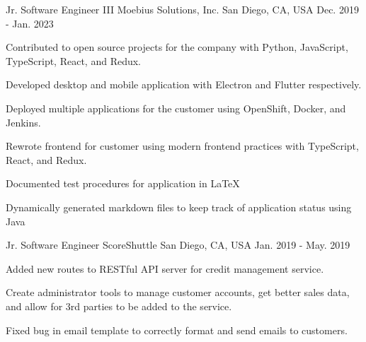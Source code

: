 

\begin{cventries}

	\cventry
	{Jr. Software Engineer III} %
	{Moebius Solutions, Inc.} %
	{San Diego, CA, USA} %
    {Dec. 2019 - Jan. 2023} %
	{
		\begin{cvitems} %
			\item {Contributed to open source projects for the company with Python, JavaScript, TypeScript, React, and Redux.}
			\item {Developed desktop and mobile application with Electron and Flutter respectively.}
			\item {Deployed multiple applications for the customer using OpenShift, Docker, and Jenkins.}
			\item {Rewrote frontend for customer using modern frontend practices with TypeScript, React, and Redux.}
			\item {Documented test procedures for application in LaTeX}
			\item {Dynamically generated markdown files to keep track of application status using Java}
		\end{cvitems}
	}

	\cventry
	{Jr. Software Engineer} %
	{ScoreShuttle} %
	{San Diego, CA, USA} %
	{Jan. 2019 - May. 2019} %
	{
		\begin{cvitems} %
			\item {Added new routes to RESTful API server for credit management service.}
			\item {Create administrator tools to manage customer accounts, get better sales data, and allow for 3rd parties to be added to the service.}
			\item {Fixed bug in email template to correctly format and send emails to customers.}
		\end{cvitems}
	}

\end{cventries}
